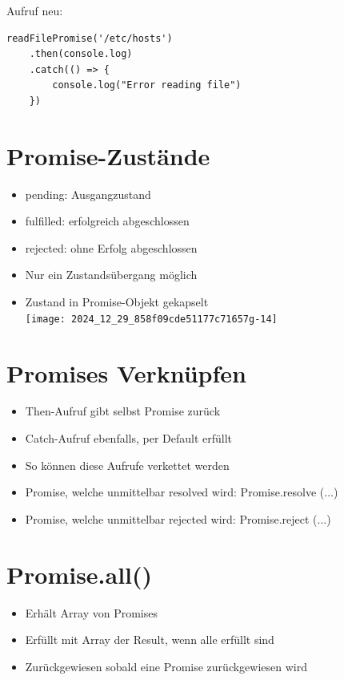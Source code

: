 Aufruf neu:

\begin{verbatim}
readFilePromise('/etc/hosts')
    .then(console.log)
    .catch(() => {
        console.log("Error reading file")
    })
\end{verbatim}

\section*{Promise-Zustände}
\begin{itemize}
  \item pending: Ausgangzustand
  \item fulfilled: erfolgreich abgeschlossen
  \item rejected: ohne Erfolg abgeschlossen
  \item Nur ein Zustandsübergang möglich
  \item Zustand in Promise-Objekt gekapselt\\
\texttt{[image: 2024\_12\_29\_858f09cde51177c71657g-14]}
\end{itemize}

\section*{Promises Verknüpfen}
\begin{itemize}
  \item Then-Aufruf gibt selbst Promise zurück
  \item Catch-Aufruf ebenfalls, per Default erfüllt
  \item So können diese Aufrufe verkettet werden
  \item Promise, welche unmittelbar resolved wird: Promise.resolve (...)
  \item Promise, welche unmittelbar rejected wird: Promise.reject (...)
\end{itemize}

\section*{Promise.all()}
\begin{itemize}
  \item Erhält Array von Promises
  \item Erfüllt mit Array der Result, wenn alle erfüllt sind
  \item Zurückgewiesen sobald eine Promise zurückgewiesen wird
\end{itemize}

